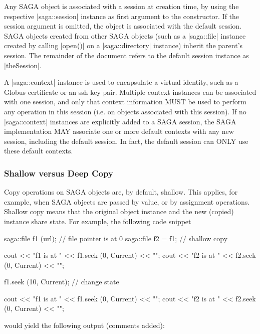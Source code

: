    Any SAGA object is associated with a session at creation
   time, by using the respective |saga::session| instance as
   first argument to the constructor.  If the session argument
   is omitted, the object is associated with the
   default session.  SAGA objects created from other SAGA
   objects (such as a |saga::file| instance created by calling
   |open()| on a |saga::directory| instance) inherit the
   parent's session.  The remainder of the document
   refers to the default session instance as |theSession|.

   A |saga::context| instance is used to encapsulate a virtual
   identity, such as a Globus certificate or an ssh key pair.
   Multiple context instances can be associated with one
   session, and only that context information MUST be
   used to perform any operation in this session (i.e. on
   objects associated with this session).  If no |saga::context|
   instances are explicitly added to a SAGA session, the SAGA
   implementation MAY associate one or more default contexts
   with any new session, including the default session.  In
   fact, the default session can ONLY use these default
   contexts.



  \subsubsection{Shallow versus Deep Copy}
  \label{ssec:shallowdeep}

   Copy operations on SAGA objects are, by default, shallow.
   This applies, for example, when SAGA objects are passed by
   value, or by assignment operations.  Shallow copy means that
   the original object instance and the new (copied) instance
   share state.  For example, the following code snippet

   \begin{mycode}
   saga::file f1 (url);        // file pointer is at 0
   saga::file f2 = f1;         // shallow copy
 
   cout << "f1 is at " << f1.seek (0, Current) << "\n";
   cout << "f2 is at " << f2.seek (0, Current) << "\n";

   f1.seek (10, Current);      // change state

   cout << "f1 is at " << f1.seek (0, Current) << "\n";
   cout << "f2 is at " << f2.seek (0, Current) << "\n";
   \end{mycode}

   would yield the following output (comments added):

